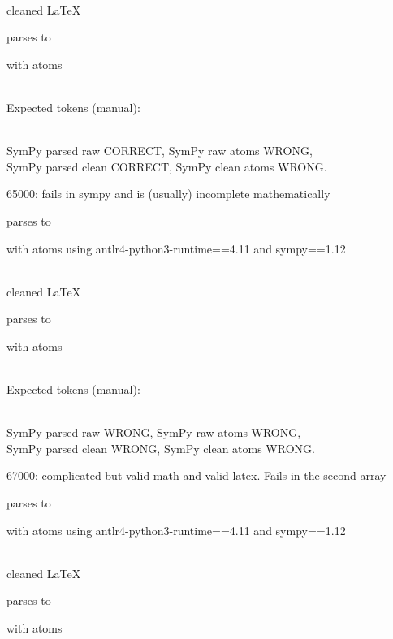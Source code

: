 \documentclass{article}
\begin{document}
\ \\
cleaned \LaTeX

parses to

with atoms


\ \\
Expected tokens (manual):


\ \\
SymPy parsed raw CORRECT, 
SymPy raw atoms WRONG, \\
SymPy parsed clean CORRECT, 
SymPy clean atoms WRONG.

\hrulefill

65000: 
fails in sympy and is (usually) incomplete mathematically

parses to

with atoms
using antlr4-python3-runtime==4.11 and sympy==1.12

\ \\
cleaned \LaTeX

parses to

with atoms


\ \\
Expected tokens (manual):


\ \\
SymPy parsed raw WRONG, 
SymPy raw atoms WRONG, \\
SymPy parsed clean WRONG, 
SymPy clean atoms WRONG.

\hrulefill

67000:
complicated but valid math and valid latex. Fails in the second array  

parses to

with atoms
using antlr4-python3-runtime==4.11 and sympy==1.12

\ \\
cleaned \LaTeX

parses to

with atoms

\end{document}
